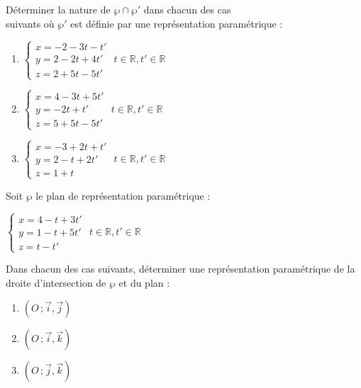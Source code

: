 \documentclass{cornouaille}
\begin{document}
\begin{colonne*exercice}
\begin{exercice}
Déterminer la nature de $\wp\cap\wp'$ dans chacun des cas\\
suivants où $\wp'$ est définie par une représentation paramétrique :
\begin{enumerate}
\item \begin{center}
    $\begin{cases}x=-2-3t-t' \\y=2-2t+4t' \\z=2+5t-5t' \end{cases}$
    $t\in\mathbb{R}, t'\in\mathbb{R}$
  \end{center}
\item \begin{center}
    $\begin{cases}x=4-3t+5t' \\y=-2t+t' \\z=5+5t-5t' \end{cases}$
    $t\in\mathbb{R}, t'\in\mathbb{R}$
  \end{center}
\item \begin{center}
    $\begin{cases}x=-3+2t+t' \\y=2-t+2t' \\z=1+t \end{cases}$
    $t\in\mathbb{R}, t'\in\mathbb{R}$
  \end{center}
\end{enumerate}
\end{exercice}

\begin{exercice}
  Soit $\wp$ le plan de représentation paramétrique :
  \begin{center}
    $\begin{cases}x=4-t+3t' \\y=1-t+5t' \\z=t-t' \end{cases}$
    $t\in\mathbb{R}, t'\in\mathbb{R}$
  \end{center}Dans chacun des cas suivants, déterminer une
  représentation paramétrique de la droite d'intersection de $\wp$ et
  du plan :
  \begin{enumerate}
  \item $(O\,;\overrightarrow{i},\overrightarrow{j})$
  \item $(O\,;\overrightarrow{i},\overrightarrow{k})$
  \item $(O\,;\overrightarrow{j},\overrightarrow{k})$
  \end{enumerate}
\end{exercice}


\end{colonne*exercice}
\end{document}

